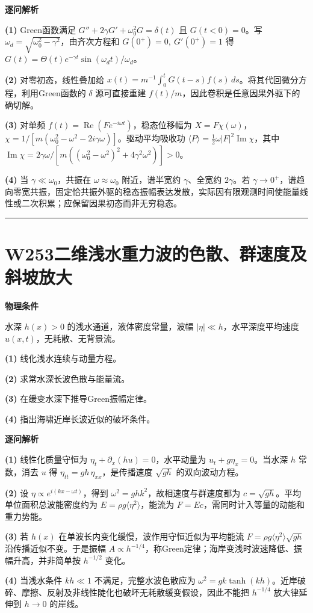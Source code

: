 \documentclass[UTF8,a4paper,11pt,oneside,openany]{ctexbook}
\begin{document}
\par\medskip\noindent\textbf{逐问解析}
\par\noindent\textbf{(1)} Green函数满足 \(G''+2\gamma G'+\omega_0^2G=\delta(t)\) 且 \(G(t<0)=0\)。写 \(\omega_d=\sqrt{\omega_0^2-\gamma^2}\)，由齐次方程和 \(G(0^+)=0,\ G'(0^+)=1\) 得 \(G(t)=\Theta(t)e^{-\gamma t}\sin(\omega_dt)/\omega_d\)。
\par\noindent\textbf{(2)} 对零初态，线性叠加给 \(x(t)=m^{-1}\int_0^tG(t-s)f(s)\,ds\)。将其代回微分方程，利用Green函数的 \(\delta\) 源可直接重建 \(f(t)/m\)，因此卷积是任意因果外驱下的确切解。
\par\noindent\textbf{(3)} 对单频 \(f(t)=\operatorname{Re}(F e^{-i\omega t})\)，稳态位移幅为 \(X=F\chi(\omega)\)，\(\chi=1/[m(\omega_0^2-\omega^2-2i\gamma\omega)]\)。驱动平均吸收功 \(\langle P\rangle=\tfrac12\omega |F|^2\operatorname{Im}\chi\)，其中 \(\operatorname{Im}\chi=2\gamma\omega/[m((\omega_0^2-\omega^2)^2+4\gamma^2\omega^2)]>0\)。
\par\noindent\textbf{(4)} 当 \(\gamma\ll\omega_0\)，共振在 \(\omega\approx\omega_0\) 附近，谱半宽约 \(\gamma\)、全宽约 \(2\gamma\)。若 \(\gamma\to0^+\)，谱趋向零宽共振，固定恰共振外驱的稳态振幅表达发散，实际因有限观测时间使能量线性或二次积累；应保留因果初态而非无穷稳态。

\par\bigskip\hrule\bigskip
\section*{W253\quad 二维浅水重力波的色散、群速度及斜坡放大}
\textbf{物理条件}\par 水深 \(h(x)>0\) 的浅水通道，液体密度常量，波幅 \(|\eta|\ll h\)，水平深度平均速度 \(u(x,t)\)，无耗散、无背景流。
\par\noindent\textbf{(1)} 线化浅水连续与动量方程。
\par\noindent\textbf{(2)} 求常水深长波色散与能量流。
\par\noindent\textbf{(3)} 在缓变水深下推导Green振幅定律。
\par\noindent\textbf{(4)} 指出海啸近岸长波近似的破坏条件。

\par\medskip\noindent\textbf{逐问解析}
\par\noindent\textbf{(1)} 线性化质量守恒为 \(\eta_t+\partial_x(hu)=0\)，水平动量为 \(u_t+g\eta_x=0\)。当水深 \(h\) 常数，消去 \(u\) 得 \(\eta_{tt}=gh\,\eta_{xx}\)，是传播速度 \(\sqrt{gh}\) 的双向波动方程。
\par\noindent\textbf{(2)} 设 \(\eta\propto e^{i(kx-\omega t)}\)，得到 \(\omega^2=ghk^2\)，故相速度与群速度都为 \(c=\sqrt{gh}\)。平均单位面积总波能密度约为 \(E=\rho g\langle\eta^2\rangle\)，能流为 \(F=Ec\)，需同时计入等量的动能和重力势能。
\par\noindent\textbf{(3)} 若 \(h(x)\) 在单波长内变化缓慢，波作用守恒近似为平均能流 \(F=\rho g\langle\eta^2\rangle\sqrt{gh}\) 沿传播近似不变。于是振幅 \(A\propto h^{-1/4}\)，称Green定律；海岸变浅时波速降低、振幅升高，并非简单按 \(h^{-1/2}\) 变化。
\par\noindent\textbf{(4)} 当浅水条件 \(kh\ll1\) 不满足，完整水波色散应为 \(\omega^2=gk\tanh(kh)\)。近岸破碎、摩擦、反射及非线性陡化也破坏无耗散缓变假设，因此不能把 \(h^{-1/4}\) 放大律延伸到 \(h\to0\) 的岸线。
\end{document}
